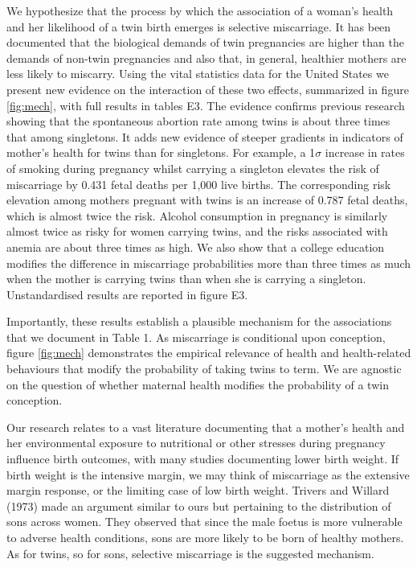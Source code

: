 \documentclass{nature}
\begin{document}
\begin{linenumbers}
We hypothesize that the process by which the association of a woman's health and her likelihood of a twin birth emerges is selective miscarriage. It has been documented that the biological demands of twin pregnancies are higher than the demands of non-twin pregnancies\cite{Shinagawaetal2005,Kahnetal2003} and also that, in general, healthier mothers are less likely to miscarry\cite{Garciaetal2002}. Using the vital statistics data for the United States we present new evidence on the interaction of these two effects, summarized in figure \ref{fig:mech}, with full results in tables E3.  The evidence confirms previous research showing that the spontaneous abortion rate among twins is about three times that among singletons\cite{Boklage1990}. It adds new evidence of steeper gradients in indicators of mother's health for twins than for singletons. For example, a 1$\sigma$ increase in rates of smoking during pregnancy whilst carrying a singleton elevates the risk of miscarriage by 0.431 fetal deaths per 1,000 live births. The corresponding risk elevation among mothers pregnant with twins is an increase of 0.787 fetal deaths, which is almost twice the risk. Alcohol consumption in pregnancy is similarly almost twice as risky for women carrying twins, and the risks associated with anemia are about three times as high. We also show that a college education modifies the difference in miscarriage probabilities more than three times as much when the mother is carrying twins than when she is carrying a singleton.  Unstandardised results are reported in figure E3.


Importantly, these results establish a plausible mechanism for the associations that we document in Table 1. As miscarriage is conditional upon conception, figure \ref{fig:mech} demonstrates the empirical relevance of health and health-related behaviours that modify the probability of taking twins to term.  We are agnostic on the question of whether maternal health modifies the probability of a twin conception.


Our research relates to a vast literature documenting that a mother's health and her environmental exposure to nutritional or other stresses during pregnancy influence birth outcomes, with many studies documenting lower birth weight\cite{CurrieMoretti2007,Bernsteinetal2005,SerranoDomeque2014}. If birth weight is the intensive margin, we may think of miscarriage as the extensive margin response, or the limiting case of low birth weight.  Trivers and Willard (1973) made an argument similar to ours but pertaining to the distribution of sons across women. They observed that since the male foetus is more vulnerable to adverse health conditions, sons are more likely to be born of healthy mothers. As for twins, so for sons, selective miscarriage is the suggested mechanism.


\end{linenumbers}
\end{document}

